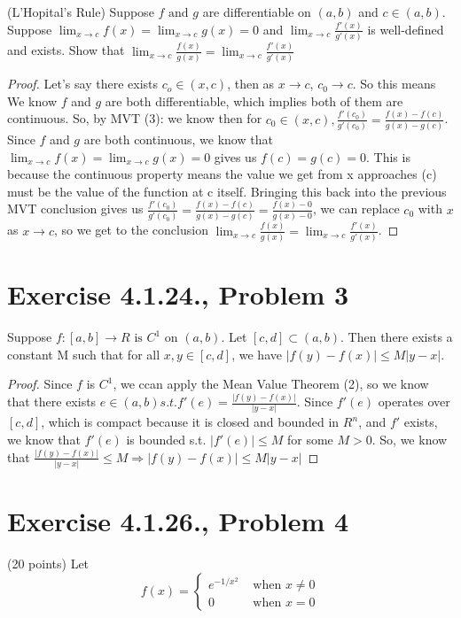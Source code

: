 \documentclass{article}
\begin{document}
(L’Hopital’s Rule) Suppose $f \text{ and } g$ are differentiable on $(a, b) $ and $c \in (a, b)$. Suppose $\lim_{x \rightarrow c} f (x) =
\lim_{x \rightarrow c} g(x) = 0$ and $\lim_{x \rightarrow c} \frac{f'(x)}{g'(x)}$ is well-defined and exists. Show that $\lim_{x \rightarrow c} \frac{f (x)}{g(x)} = \lim_{x \rightarrow c} \frac{f'(x)}{g'(x)}$
\begin{proof}
Let's say there exists $c_o \in (x, c)$, then as $x \rightarrow c$, $c_0 \rightarrow c$. So this means We know $f$ and $g$ are both differentiable, which implies both of them are continuous. So, by MVT (3): we know then for $c_0 \in (x,c), \frac{f'(c_0)}{g'(c_0)} = \frac{f(x) - f(c)}{g(x) - g(c)}$. \\
Since $f$ and $g$ are both continuous, we know that $\lim_{x \rightarrow c} f (x) = \lim_{x \rightarrow c} g(x) = 0$ gives us $f(c) = g(c) = 0$. This is because the continuous property means the value we get from x approaches (c) must be the value of the function at c itself. Bringing this back into the previous MVT conclusion gives us $ \frac{f'(c_0)}{g'(c_0)} = \frac{f(x) - f(c)}{g(x) - g(c)} = \frac{f(x) - 0}{g(x) - 0}$, we can replace $c_0$ with $x$ as $x \rightarrow c$, so we get to the conclusion $\lim_{x \rightarrow c} \frac{f (x)}{g(x)} = \lim_{x \rightarrow c} \frac{f'(x)}{g'(x)}$.




\end{proof}
\clearpage
\section*{Exercise 4.1.24., Problem 3}
Suppose $f : [a, b] \rightarrow R \text{ is } C^1$ on $(a, b)$. Let $[c, d] \subset (a, b)$. Then there exists a constant M such that for all $x, y \in [c, d]$, we have $|f (y) - f (x)| \leq M |y - x|$.

\begin{proof}
Since $f$ is $C^1$, we ccan apply the Mean Value Theorem (2), so we know that there exists $e \in (a,b) s.t.f'(e) = \frac{|f(y)-f(x)|}{|y-x|}.$ Since $f'(e)$ operates over $[c,d]$, which is compact because it is closed and bounded in $R^n$, and $f'$ exists, we know that $f'(e)$ is bounded s.t. $|f'(e)| \leq M$ for some $M> 0$. So, we know that $\frac{|f(y)-f(x)|}{|y-x|} \leq M \Rightarrow |f (y) - f (x)| \leq M |y - x|$
\end{proof}
\clearpage


\section*{Exercise 4.1.26., Problem 4}
 (20 points)
Let
$$
f(x) = 
\begin{cases}
    e^{-1/x^2} & \text{ when } x \neq 0 \\
    0 & \text{ when } x = 0  
\end{cases}
$$
\end{document}

